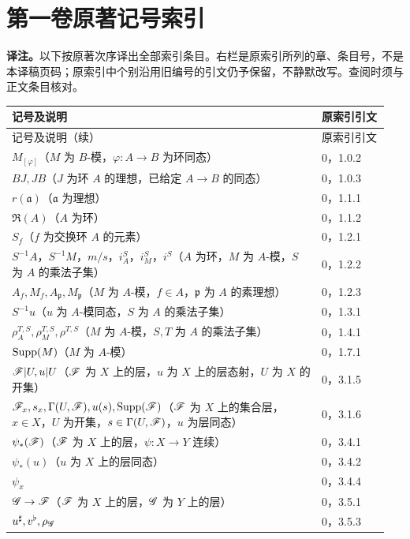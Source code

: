 \chapter*{第一卷原著记号索引}
\noindent\textbf{译注。}以下按原著次序译出全部索引条目。右栏是原索引所列的章、条目号，不是本译稿页码；原索引中个别沿用旧编号的引文仍予保留，不静默改写。查阅时须与正文条目核对。
\begingroup\small
\renewcommand{\arraystretch}{1.15}
\begin{longtable}{@{}p{0.78\linewidth}p{0.17\linewidth}@{}}
\toprule 记号及说明&原索引引文\\\midrule\endfirsthead
\toprule 记号及说明（续）&原索引引文\\\midrule\endhead
\bottomrule\endfoot
$M_{[\varphi]}$（$M$ 为 $B$-模，$\varphi:A\to B$ 为环同态）&0，1.0.2\\
$BJ,JB$（$J$ 为环 $A$ 的理想，已给定 $A\to B$ 的同态）&0，1.0.3\\
$r(\mathfrak a)$（$\mathfrak a$ 为理想）&0，1.1.1\\
$\mathfrak R(A)$（$A$ 为环）&0，1.1.2\\
$S_f$（$f$ 为交换环 $A$ 的元素）&0，1.2.1\\
$S^{-1}A$，$S^{-1}M$，$m/s$，$i_A^S$，$i_M^S$，$i^S$（$A$ 为环，$M$ 为 $A$-模，$S$ 为 $A$ 的乘法子集）&0，1.2.2\\
$A_f,M_f,A_{\mathfrak p},M_{\mathfrak p}$（$M$ 为 $A$-模，$f\in A$，$\mathfrak p$ 为 $A$ 的素理想）&0，1.2.3\\
$S^{-1}u$（$u$ 为 $A$-模同态，$S$ 为 $A$ 的乘法子集）&0，1.3.1\\
$\rho_A^{T,S},\rho_M^{T,S},\rho^{T,S}$（$M$ 为 $A$-模，$S,T$ 为 $A$ 的乘法子集）&0，1.4.1\\
$\operatorname{Supp}(M)$（$M$ 为 $A$-模）&0，1.7.1\\
$\mathscr F|U,u|U$（$\mathscr F$ 为 $X$ 上的层，$u$ 为 $X$ 上的层态射，$U$ 为 $X$ 的开集）&0，3.1.5\\
$\mathscr F_x,s_x,\Gamma(U,\mathscr F),u(s),\operatorname{Supp}(\mathscr F)$（$\mathscr F$ 为 $X$ 上的集合层，$x\in X$，$U$ 为开集，$s\in\Gamma(U,\mathscr F)$，$u$ 为层同态）&0，3.1.6\\
$\psi_*(\mathscr F)$（$\mathscr F$ 为 $X$ 上的层，$\psi:X\to Y$ 连续）&0，3.4.1\\
$\psi_*(u)$（$u$ 为 $X$ 上的层同态）&0，3.4.2\\
$\psi_x$&0，3.4.4\\
$\mathscr G\to\mathscr F$（$\mathscr F$ 为 $X$ 上的层，$\mathscr G$ 为 $Y$ 上的层）&0，3.5.1\\
$u^\sharp,v^\flat,\rho_{\mathscr G}$&0，3.5.3\\

\end{longtable}
